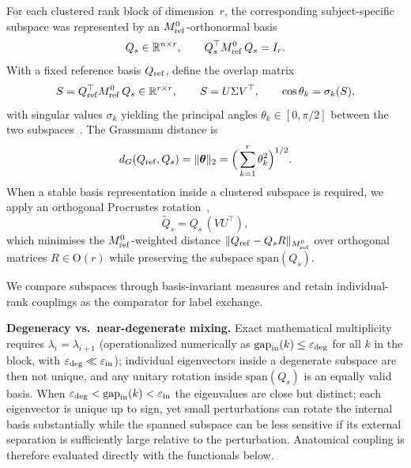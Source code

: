 \documentclass[pdflatex,sn-basic]{sn-jnl}
\begin{document}
For each clustered rank block of dimension~$r$, the corresponding subject-specific subspace was represented by an $M_{\rm ref}^{0}$-orthonormal basis
\begin{equation}
Q_s\in\mathbb R^{n\times r},\qquad Q_s^\top M_{\rm ref}^{0}\,Q_s=I_r.
\end{equation}
With a fixed reference basis $Q_{\rm ref}$, define the overlap matrix
\begin{equation}
S=Q_{\rm ref}^\top M_{\rm ref}^{0}\,Q_s\in\mathbb R^{r\times r},\qquad S=U\Sigma V^\top,\qquad \cos\theta_k=\sigma_k(S),
\label{eq:overlap}
\end{equation}
with singular values $\sigma_k$ yielding the principal angles $\theta_k\in[0,\pi/2]$ between the two subspaces~\citep{BjorckGolub1973Angles}.
The Grassmann distance is
\begin{equation}
d_G(Q_{\rm ref},Q_s)=\|\boldsymbol\theta\|_2=\Big(\sum_{k=1}^{r}\theta_k^2\Big)^{1/2}.
\label{eq:grassmann}
\end{equation}
When a stable basis representation inside a clustered subspace is required, we apply an orthogonal Procrustes rotation~\citep{Schoenemann1966Procrustes},
\begin{equation}
\widetilde Q_s=Q_s\,(V U^\top),
\label{eq:procrustes}
\end{equation}
which minimises the $M_{\rm ref}^{0}$-weighted distance $\|Q_{\rm ref} - Q_s R\|_{M_{\rm ref}^0}$ over orthogonal matrices $R\in\mathrm O(r)$ while preserving the subspace $\mathrm{span}(Q_s)$.

We compare subspaces through basis-invariant measures and retain individual-rank couplings as the comparator for label exchange.

\noindent\textbf{Degeneracy vs.\ near-degenerate mixing.}
Exact mathematical multiplicity requires $\lambda_i = \lambda_{i+1}$ (operationalized numerically as $\mathrm{gap}_{\rm in}(k)\le\varepsilon_{\rm deg}$ for all $k$ in the block, with $\varepsilon_{\rm deg}\ll\varepsilon_{\rm in}$); individual eigenvectors inside a degenerate subspace are then not unique, and any unitary rotation inside $\mathrm{span}(Q_s)$ is an equally valid basis.
When $\varepsilon_{\rm deg}<\mathrm{gap}_{\rm in}(k)<\varepsilon_{\rm in}$ the eigenvalues are close but distinct; each eigenvector is unique up to sign, yet small perturbations can rotate the internal basis substantially while the spanned subspace can be less sensitive if its external separation is sufficiently large relative to the perturbation. Anatomical coupling is therefore evaluated directly with the functionals below.
\end{document}
